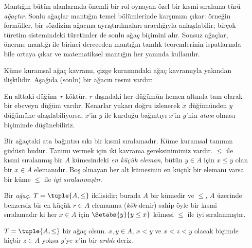 


Mantığın bütün alanlarında önemli bir rol oynayan özel bir kısmi sıralama türü
\emph{ağaçtır}. Sonlu ağaçlar mantığın temel bölümlerinde karşımıza çıkar:
örneğin formüller, bir sözdizim ağacına ayrıştırılmaları aracılığıyla
anlaşılabilir; birçok türetim sistemindeki türetimler de sonlu ağaç biçimini
alır.
%
Sonsuz ağaçlar, önerme mantığı ile birinci dereceden mantığın tamlık
teoremlerinin ispatlarında bile ortaya çıkar ve matematiksel mantığın
her yanında kullanılır.

Küme kuramsal ağaç kavramı, çizge kuramındaki ağaç kavramıyla yakından
ilişkilidir. Aşağıda (sonlu) bir ağacın resmi vardır:

\begin{center}
\end{center}

En alttaki düğüm~$r$ köktür. $r$ dışındaki her düğümün hemen altında tam
olarak bir ebeveyn düğüm vardır. Kenarlar yukarı doğru izlenerek $x$
düğümünden $y$ düğümüne ulaşılabiliyorsa, $x$'in $y$ ile kurduğu bağıntıyı
$x$'in $y$'nin \emph{atası} olması biçiminde düşünebiliriz.

Bir ağaçtaki ata bağıntısı sıkı bir kısmi sıralamadır. Küme kuramsal tanımın
güdüsü budur. Tanımı vermek için iki kavrama gereksinimimiz vardır. $\le$ ile
kısmi sıralanmış bir $A$ kümesindeki \emph{en küçük eleman}, bütün $y \in A$
için $x \le y$ olan bir $x \in A$ elemanıdır. Boş olmayan her alt kümesinin en
küçük bir elemanı varsa bir küme $\le$ ile \emph{iyi sıralanmıştır}.

\begin{defn}[Ağaç]
Bir \emph{ağaç}, $T=\tuple{A,\le}$ ikilisidir; burada $A$ bir kümedir ve
$\le$, $A$ üzerinde benzersiz bir en küçük $r \in A$ elemanına (\emph{kök}
denir) sahip öyle bir kısmi sıralamadır ki her $x \in A$ için
$\Setabs{y}{y \le x}$ kümesi $\le$ ile iyi sıralanmıştır.
\end{defn}

\begin{defn}[Ardıllar]
$T=\tuple{A,\le}$ bir ağaç olsun. $x,y \in A$, $x<y$ ve $x<z<y$ olacak
biçimde hiçbir $z \in A$ yoksa $y$'ye $x$'in bir \emph{ardılı} deriz.
\end{defn}

